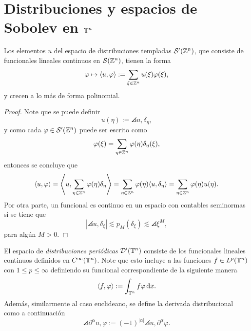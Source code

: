 \section{Distribuciones y espacios de Sobolev en $\mathbb{T}^n$}
\begin{theorem}
	Los elementos $u$ del espacio de distribuciones templadas $\mathcal{S}'(\mathbb{Z}^n)$, que consiste de funcionales lineales continuos en $\mathcal{S}(\mathbb{Z}^n)$,  tienen la forma 
	\begin{equation*}
		\varphi \mapsto \langle u, \varphi\rangle := \sum_{\xi\in\mathbb{Z}^n} u(\xi)\varphi(\xi),
	\end{equation*}
	y crecen a lo más de forma polinomial.
\end{theorem} 
\begin{proof}
	Note que se puede definir 
	\begin{equation*}
		u(\eta) := \angles{u, \delta_\eta},
	\end{equation*}
	y como cada $\varphi\in\mathcal{S}'(\mathbb{Z}^n)$ puede ser escrito como 
	\begin{equation*}
		\varphi(\xi) = \sum_{\eta\in\mathbb{Z}^n} \varphi(\eta)\delta_\eta(\xi),
	\end{equation*}
	entonces se concluye que 
	\begin{equation*}
		\langle u, \varphi\rangle = \left\langle u, \sum_{\eta\in\mathbb{Z}^n}  \varphi(\eta)\delta_\eta \right\rangle = \sum_{\eta\in\mathbb{Z}^n}  \varphi(\eta)\langle u, \delta_\eta\rangle = \sum_{\eta\in\mathbb{Z}^n}  \varphi(\eta)u(\eta).
	\end{equation*}
	Por otra parte, un funcional es continuo en un espacio con contables seminormas si se tiene que 
	\begin{equation*}
		|\angles{u, \delta_\xi}| \lesssim p_M(\delta_\xi) \lesssim \angles{\xi}^M,
	\end{equation*}
	para algún $M>0$.
\end{proof}
\begin{definition}
	El espacio de \textit{distribuciones periódicas} $\mathcal{D}'(\mathbb{T}^n)$ consiste de los funcionales lineales continuos definidos en $C^\infty(\mathbb{T}^n)$. Note que esto incluye a las funciones $f\in L^p(\mathbb{T}^n)$ con $1\leq p\leq\infty$ definiendo su funcional correspondiente de la siguiente manera
	\begin{equation*}
		\langle f, \varphi\rangle := \int_{\mathbb{T}^n} f\varphi\mathop{}\!\mathrm{d} x.
	\end{equation*}
	Además, similarmente al caso euclideano, se define la derivada distribucional como a continuación 
	\begin{equation*}
		\angles{\partial^\alpha u, \varphi} := (-1)^{|\alpha|}\angles{u, \partial^\alpha\varphi}.
	\end{equation*}
\end{definition}

